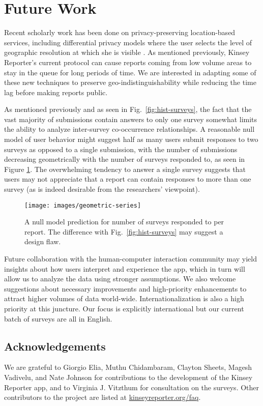 \documentclass{sigchi}
\begin{document}
\section{Future Work}

Recent scholarly work has been done on privacy-preserving location-based services, including differential privacy models where the user selects the level of geographic resolution at which she is visible \cite{Andres2013}. As mentioned previously, Kinsey Reporter's current protocol can cause reports coming from low volume areas to stay in the queue for long periods of time. We are interested in adapting some of these new techniques to preserve geo-indistinguishability while reducing the time lag before making reports public.


As mentioned previously and as seen in Fig.~\ref{fig:hist-surveys}, the fact that the vast majority of submissions contain answers to only one survey somewhat limits the ability to analyze inter-survey co-occurrence relationships.
A reasonable null model of user behavior might suggest half as many users submit responses to two surveys as opposed to a single submission, with the number of submissions decreasing geometrically with the number of surveys responded to, as seen in Figure \ref{fig:geometric-series}.
The overwhelming tendency to answer a single survey suggests that users may not appreciate that a report can contain responses to more than one survey (as is indeed desirable from the researchers' viewpoint).

\begin{figure}
\texttt{[image: images/geometric-series]}
\caption{A null model prediction for number of surveys responded to per report. The difference with Fig.~\ref{fig:hist-surveys} may suggest a design flaw.}
\label{fig:geometric-series}
\end{figure}

Future collaboration with the human-computer interaction community may yield insights about how users interpret and experience the app, which in turn will allow us to analyze the data using stronger assumptions.
We also welcome suggestions about necessary improvements and high-priority enhancements to attract higher volumes of data world-wide.
Internationalization is also a high priority at this juncture. Our focus is explicitly international but our current batch of surveys are all in English.

\subsection{Acknowledgements}

We are grateful to Giorgio Elia, Muthu Chidambaram, Clayton Sheets, Magesh Vadivelu, and Nate Johnson for contributions to the development of the Kinsey Reporter app, and to Virginia J. Vitzthum for consultation on the surveys. Other contributors to the project are listed at \url{kinseyreporter.org/faq}.

{}

\end{document}
